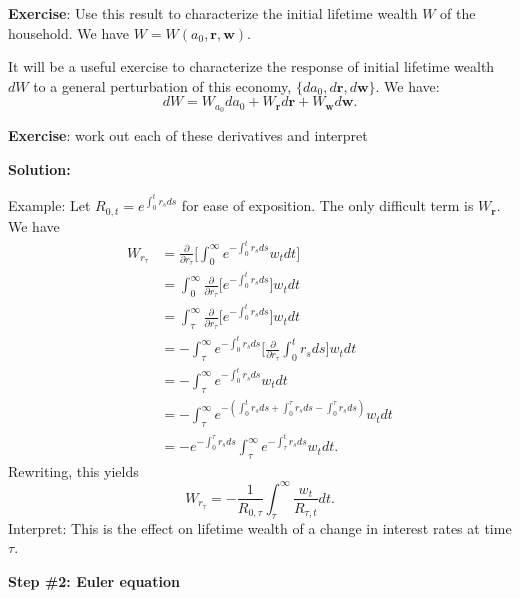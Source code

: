 \documentclass[11pt]{extarticle}
\theoremstyle{plain}
\theoremstyle{definition}
\begin{document}
\textbf{Exercise}: Use this result to characterize the initial lifetime wealth $W$ of the household. We have $W = W(a_0, \bm{r}, \bm{w})$. 


\vspace{5mm}
\noindent
It will be a useful exercise to characterize the response of initial lifetime wealth $dW$ to a general perturbation of this economy, $\{da_0, d \bm r, d \bm w\}$. We have:
\begin{equation*}
	dW = W_{a_0} da_0 + W_{\bm r} d \bm{r} + W_{ \bm w} d \bm w. 
\end{equation*}

\textbf{Exercise}: work out each of these derivatives and interpret 

\textbf{Solution:}



Example: Let $R_{0,t} = e^{\int_0^t r_s ds }$ for ease of exposition. The only difficult term is $W_{\bm r}$. We have 
\begin{align*}
	W_{r_\tau} &= \frac{\partial }{\partial r_{\tau}} \bigg[ \int_0^\infty e^{- \int_0^t r_s ds }   w_t dt \bigg] \\
	&= \int_0^\infty \frac{\partial }{\partial r_{\tau}} \bigg[e^{- \int_0^t r_s ds } \bigg] w_t dt  \\
	&= \int_\tau^\infty \frac{\partial }{\partial r_{\tau}} \bigg[e^{- \int_0^t r_s ds } \bigg] w_t dt  \\
	&= - \int_\tau^\infty e^{- \int_0^t r_s ds } \bigg[ \frac{\partial }{\partial r_{\tau}} \int_0^t r_s ds \bigg] w_t dt  \\
	&= - \int_\tau^\infty e^{- \int_0^t r_s ds } w_t dt  \\
	&= - \int_\tau^\infty e^{- (\int_0^t r_s ds + \int_0^\tau r_s ds - \int_0^\tau r_s ds)} w_t dt  \\
	&= - e^{- \int_0^\tau r_s ds } \int_\tau^\infty e^{- \int_\tau^t r_s ds} w_t dt .
\end{align*}
Rewriting, this yields 
\begin{equation*}
	W_{r_\tau} = - \frac{1}{R_{0, \tau}} \int_\tau^\infty \frac{w_t}{R_{\tau, t}} dt.
\end{equation*}
Interpret: This is the effect on lifetime wealth of a change in interest rates at time $\tau$.

\vspace{5mm}
\noindent
\textbf{Step \#2: Euler equation}
\end{document}
